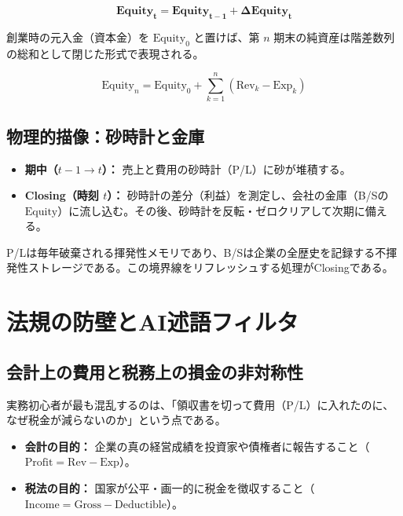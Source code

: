 \documentclass[11pt, a4paper]{report}
\begin{document}
\begin{equation}
    \mathbf{\text{Equity}_t = \text{Equity}_{t-1} + \Delta \text{Equity}_t}
\end{equation}

創業時の元入金（資本金）を $\text{Equity}_0$ と置けば、第 $n$ 期末の純資産は階差数列の総和として閉じた形式で表現される。

\begin{equation}
    \text{Equity}_n = \text{Equity}_0 + \sum_{k=1}^n (\text{Rev}_k - \text{Exp}_k)
\end{equation}

\section{物理的描像：砂時計と金庫}

\begin{itemize}
    \item \textbf{期中（$t-1 \to t$）：} 売上と費用の砂時計（P/L）に砂が堆積する。
    \item \textbf{Closing（時刻 $t$）：} 砂時計の差分（利益）を測定し、会社の金庫（B/Sの $\text{Equity}$）に流し込む。その後、砂時計を反転・ゼロクリアして次期に備える。
\end{itemize}

P/Lは毎年破棄される揮発性メモリであり、B/Sは企業の全歴史を記録する不揮発性ストレージである。この境界線をリフレッシュする処理がClosingである。

\chapter{法規の防壁とAI述語フィルタ}
\label{chap:tax_ai_filter}

\section{会計上の費用と税務上の損金の非対称性}

実務初心者が最も混乱するのは、「領収書を切って費用（P/L）に入れたのに、なぜ税金が減らないのか」という点である。
\begin{itemize}
    \item \textbf{会計の目的：} 企業の真の経営成績を投資家や債権者に報告すること（$\text{Profit} = \text{Rev} - \text{Exp}$）。
    \item \textbf{税法の目的：} 国家が公平・画一的に税金を徴収すること（$\text{Income} = \text{Gross} - \text{Deductible}$）。
\end{itemize}
\end{document}

